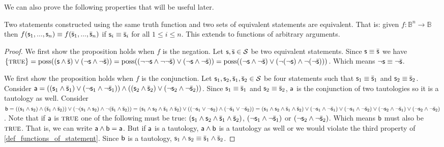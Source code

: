 \documentclass[11pt,letterpaper,fleqn]{memoir} %
\begin{document}
We can also prove the following properties that will be useful later.


\begin{mathSection}
	
	\begin{prop}
		Two statements constructed using the same truth function and two sets of equivalent statements are equivalent. That is: given $f : \mathbb{B}^n \to \mathbb{B}$ then $f(\stmt_1, ..., \stmt_n) \equiv f(\bar{\stmt}_1, ..., \bar{\stmt}_n)$ if $\stmt_i \equiv \bar{\stmt}_i$ for all $1 \leq i \leq n$. This extends to functions of arbitrary arguments.
	\end{prop}
	\begin{proof}
		We first show the proposition holds when $f$ is the negation. Let $\stmt, \bar{\stmt} \in \mathcal{S}$ be two equivalent statements. Since $\stmt \equiv \bar{\stmt}$ we have $\{\TRUE\} = \poss((\stmt \AND \bar{\stmt}) \OR (\NOT \stmt \AND \NOT \bar{\stmt})) = \poss((\NOT \NOT \stmt \AND \NOT \NOT \bar{\stmt}) \OR (\NOT \stmt \AND \NOT \bar{\stmt})) = \poss((\NOT \stmt \AND \NOT \bar{\stmt}) \OR (\NOT (\NOT \stmt) \AND \NOT (\NOT \bar{\stmt})))$. Which means  $\NOT \stmt \equiv \NOT \bar{\stmt}$.
		
		We first show the proposition holds when $f$ is the conjunction. Let $\stmt_1, \stmt_2, \bar{\stmt}_1, \bar{\stmt}_2 \in \mathcal{S}$ be four statements such that $\stmt_1 \equiv \bar{\stmt}_1$ and $\stmt_2 \equiv \bar{\stmt}_2$. Consider $\stmt[a] = ((\stmt_1 \AND \bar{\stmt}_1) \OR (\NOT \stmt_1 \AND \NOT \bar{\stmt}_1)) \AND ((\stmt_2 \AND \bar{\stmt}_2) \OR (\NOT \stmt_2 \AND \NOT \bar{\stmt}_2))$. Since $\stmt_1 \equiv \bar{\stmt}_1$ and $\stmt_2 \equiv \bar{\stmt}_2$, $\stmt[a]$ is the conjunction of two tautologies so it is a tautology as well. Consider $\stmt[b] = ((\stmt_1 \AND \stmt_2) \AND (\bar{\stmt}_1 \AND \bar{\stmt}_2)) \OR  (\NOT (\stmt_1 \AND \stmt_2) \AND \NOT (\bar{\stmt}_1 \AND \bar{\stmt}_2))= 	
		(\stmt_1 \AND \stmt_2 \AND \bar{\stmt}_1 \AND \bar{\stmt}_2) \OR ((\NOT \stmt_1 \OR \NOT \stmt_2) \AND (\NOT \bar{\stmt}_1 \OR \NOT \bar{\stmt}_2)) = (\stmt_1 \AND \stmt_2 \AND \bar{\stmt}_1 \AND \bar{\stmt}_2) \OR (\NOT \stmt_1 \AND \NOT \bar{\stmt}_1) \OR (\NOT \stmt_1 \AND \NOT \bar{\stmt}_2) \OR (\NOT \stmt_2 \AND \NOT \bar{\stmt}_1) \OR (\NOT \stmt_2 \AND \NOT \bar{\stmt}_2)$. Note that if $\stmt[a]$ is $\TRUE$ one of the following must be true: $(\stmt_1 \AND \stmt_2 \AND \bar{\stmt}_1 \AND \bar{\stmt}_2)$, $(\NOT \stmt_1 \AND \NOT \bar{\stmt}_1)$ or $(\NOT \stmt_2 \AND \NOT \bar{\stmt}_2)$. Which means $\stmt[b]$ must also be $\TRUE$. That is, we can write $\stmt[a] \AND \stmt[b] = \stmt[a]$. But if $\stmt[a]$ is a tautology, $\stmt[a] \AND \stmt[b]$ is a tautology as well or we would violate the third property of \ref{def_functions_of_statement}. Since $\stmt[b]$ is a tautology, $\stmt_1 \AND \stmt_2 \equiv \bar{\stmt}_1 \AND \bar{\stmt}_2$.
		

\end{proof}
\end{mathSection}
\end{document}
